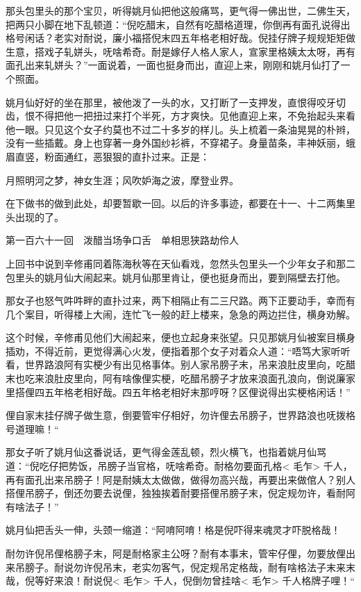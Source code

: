 \documentclass[12pt,UTF8]{ctexbook}
\begin{document}
{{{那头包里头的那个宝贝，听得姚月仙把他这般痛骂，更气得一佛出世，二佛生天，把两只小脚在地下乱顿道：“倪吃醋末，自然有吃醋格道理，你倒再有面孔说得出格号闲话？老实对耐说，廉小福搭倪末四五年格老相好哉。倪挂仔牌子规规矩矩做生意，搭戏子轧姘头，呒啥希奇。耐是嫁仔人格人家人，宣家里格姨太太呀，再有面孔出来轧姘头？”一面说着，一面也挺身而出，直迎上来，刚刚和姚月仙打了一个照面。

姚月仙好好的坐在那里，被他泼了一头的水，又打断了一支押发，直恨得咬牙切齿，恨不得把他一把扭过来打个半死，方才爽快。见他直迎上来，不免抬起头来看他一眼。只见这个女子约莫也不过二十多岁的样儿。头上梳着一条油晃晃的朴辫，没有一些插戴。身上也穿著一身外国纱衫裤，不穿裙子。身量苗条，丰神妖丽，蛾眉直竖，粉面通红，恶狠狠的直扑过来。正是：

月照明河之梦，神女生涯；风吹妒海之波，摩登业界。

在下做书的做到此处，却要暂歇一回。以后的许多事迹，都要在十一、十二两集里头出现的了。





第一百六十一回　泼醋当场争口舌　单相思狭路劫伶人



上回书中说到辛修甫同着陈海秋等在天仙看戏，忽然头包里头一个少年女子和那二包里头的姚月仙大闹起来。姚月仙那里肯让，便也挺身而出，要到隔壁去打他。

那女子也怒气吽吽畔的直扑过来，两下相隔止有二三尺路。两下正要动手，幸而有几个案目，听得楼上大闹，连忙飞一般的赶上楼来，急急的两边拦住，横身劝解。

这个时候，辛修甫见他们大闹起来，便也立起身来张望。只见那姚月仙被案目横身插劝，不得近前，更觉得满心火发，便指着那个女子对着众人道：“唔笃大家听听看，世界路浪阿有实梗少有出见格事体。别人家吊膀子末，吊来浪肚皮里向，吃醋末也吃来浪肚皮里向，阿有啥像俚实梗，吃醋吊膀子才放来浪面孔浪向，倒说廉家里搭俚四五年格老相好哉。四五年格老相好末那哼呀？区俚说得出实梗格闲话！”

俚自家末挂仔牌子做生意，倒要管牢仔相好，勿许俚去吊膀子，世界路浪也呒拨格号道理嘛！“

那女子听了姚月仙这番说话，更气得金莲乱顿，烈火横飞，也指着姚月仙骂道：“倪吃仔把势饭，吊膀子当官格，呒啥希奇。耐格勿要面孔格< 毛乍> 千人，再有面孔出来吊膀子！阿是耐姨太太做做，做得勿高兴哉，再要出来做倌人？别人搭俚吊膀子，倒还勿要去说俚，独独挨着耐要搭俚吊膀子末，倪定规勿许，看耐阿有啥法子！”

姚月仙把舌头一伸，头颈一缩道：“阿唷阿唷！格是倪吓得来魂灵才吓脱格哉！

耐勿许倪吊俚格膀子末，阿是耐格家主公呀？耐有本事末，管牢仔俚，勿要放俚出来吊膀子。耐说勿许倪吊末，老实勿客气，倪定规吊定格哉，耐有啥格法子末来末哉，倪等好来浪！耐说倪< 毛乍> 千人，倪倒勿曾挂啥< 毛乍> 千人格牌子哩！“

}}}
\end{document}
